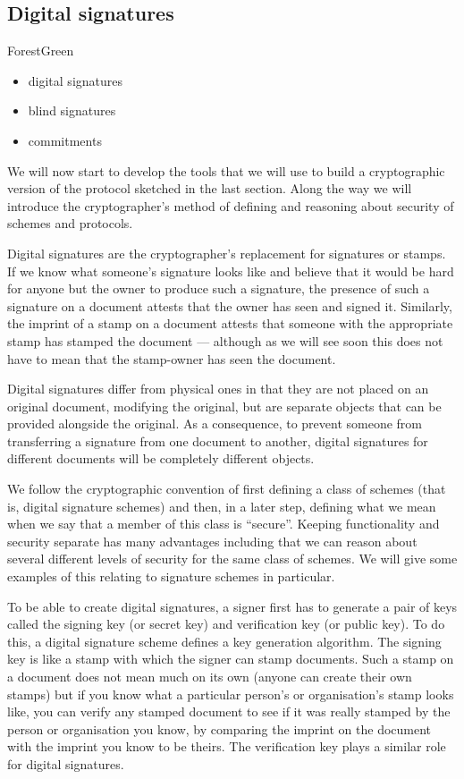 \documentclass{llncs}
\newenvironment{structure}{
  \begin{color}{ForestGreen}
}{
  \end{color}
}
\begin{document}
\subsection{Digital signatures}

\begin{structure}
\begin{itemize}
\item digital signatures
\item blind signatures
\item commitments
\end{itemize}
\end{structure}

We will now start to develop the tools that we will use to build a cryptographic
version of the protocol sketched in the last section. Along the way we will
introduce the cryptographer's method of defining and reasoning about security of
schemes and protocols.

Digital signatures are the cryptographer's replacement for signatures or stamps.
If we know what someone's signature looks like and believe that it would be hard
for anyone but the owner to produce such a signature, the presence of such a
signature on a document attests that the owner has seen and signed it.
Similarly, the imprint of a stamp on a document attests that someone with the
appropriate stamp has stamped the document --- although as we will see soon this
does not have to mean that the stamp-owner has seen the document.

Digital signatures differ from physical ones in that they are not placed on an
original document, modifying the original, but are separate objects that can be
provided alongside the original. As a consequence, to prevent someone from
transferring a signature from one document to another, digital signatures for
different documents will be completely different objects.

We follow the cryptographic convention of first defining a class of schemes
(that is, digital signature schemes) and then, in a later step, defining what we
mean when we say that a member of this class is ``secure''. Keeping
functionality and security separate has many advantages including that we can
reason about several different levels of security for the same class of schemes.
We will give some examples of this relating to signature schemes in particular.

To be able to create digital signatures, a signer first has to generate a pair
of keys called the signing key (or secret key) and verification key (or public
key). To do this, a digital signature scheme defines a key generation algorithm.
The signing key is like a stamp with which the signer can stamp documents. Such
a stamp on a document does not mean much on its own (anyone can create their own
stamps) but if you know what a particular person's or organisation's stamp looks
like, you can verify any stamped document to see if it was really stamped by the
person or organisation you know, by comparing the imprint on the document with
the imprint you know to be theirs. The verification key plays a similar role for
digital signatures.
\end{document}
